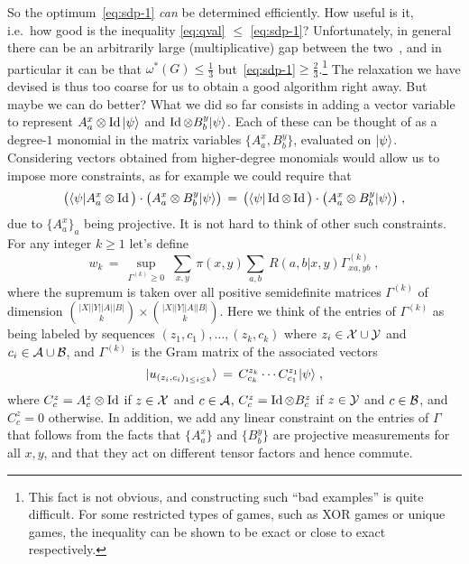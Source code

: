 So the optimum~\eqref{eq:sdp-1} \emph{can} be determined efficiently. How useful is it, i.e.\ how good is the inequality \eqref{eq:qval} $\leq$ \eqref{eq:sdp-1}? Unfortunately, in general there can be an arbitrarily large (multiplicative) gap between the two~\cite{junge2011large}, and in particular it can be that $\omega^*(G) \leq \frac{1}{3}$ but~\eqref{eq:sdp-1}$\geq \frac{2}{3}$.\footnote{This fact is not obvious, and constructing such ``bad examples'' is quite difficult. For some restricted types of games, such as XOR games or unique games, the inequality can be shown to be exact or close to exact respectively.} The relaxation we have devised is thus too coarse for us to obtain a good algorithm right away. 
 But maybe we can do better? What we did so far consists in adding a vector variable to represent $A^x_a \otimes \mathop{\rm Id}\nolimits |\psi\rangle$ and $\mathop{\rm Id}\nolimits \otimes B^y_b |\psi\rangle$. Each of these can be thought of as a degree-$1$ monomial in the matrix variables $\{A^x_a,B^y_b\}$, evaluated on $|\psi\rangle$. Considering vectors obtained from higher-degree monomials would allow us to impose more constraints, as for example we could require that 
\[ \big(\langle\psi| A^x_a  \otimes \mathop{\rm Id}\nolimits \big)\cdot \big( A^x_a \otimes B^y_b |\psi\rangle\big)\,=\,  \big(\langle\psi|\mathop{\rm Id}\nolimits \otimes \mathop{\rm Id}\nolimits \big)\cdot \big( A^x_a \otimes B^y_b |\psi\rangle\big)\;,\]
due to $\{A^x_a\}_a$ being projective. It is not hard to think of other such constraints. For any integer $k\geq 1$ let's define
\begin{equation}\label{eq:opt-sdpk}
w_k\,=\, \sup_{ \Gamma^{(k)} \geq 0 } \;\sum_{x,y}\, \pi(x,y) \sum_{a,b}\, R(a,b|x,y) \Gamma^{(k)}_{xa,yb}\;,
\end{equation}
where the supremum is taken over all positive semidefinite matrices $\Gamma^{(k)}$ of dimension ${|X||Y||A||B| \choose k}\times {|X||Y||A||B| \choose k}$. Here we think of the entries of $\Gamma^{(k)}$ as being labeled by sequences $(z_1,c_1),\ldots,(z_k,c_k)$ where $z_i \in \mathcal{X}\cup\mathcal{Y}$ and $c_i \in \mathcal{A}\cup\mathcal{B}$, and $\Gamma^{(k)}$ is the Gram matrix of the associated vectors 
\[|u_{(z_i,c_i)_{1\leq i \leq k}}\rangle \,=\, C^{z_k}_{c_k} \cdots C^{z_1}_{c_1} |\psi\rangle\;,\]
where $C^z_c = A^z_c\otimes \mathop{\rm Id}\nolimits$ if $z\in \mathcal{X}$ and $c\in \mathcal{A}$, $C^z_c = \mathop{\rm Id}\nolimits \otimes B^z_c$ if $z\in \mathcal{Y}$ and $c\in \mathcal{B}$, and $C^z_c=0$ otherwise. In addition, we add any linear constraint on the entries of $\Gamma$ that follows from the facts that $\{A^x_a\}$ and $\{B^y_b\}$ are projective measurements for all $x,y$, and that they act on different tensor factors and hence commute. 

